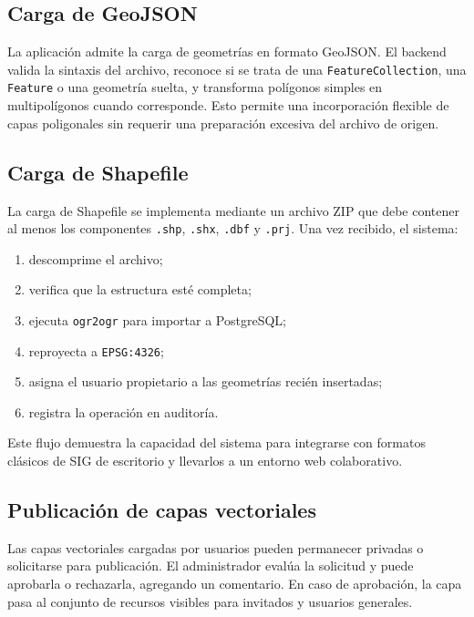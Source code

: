 \documentclass[12pt,a4paper]{report}
\begin{document}
\subsection{Carga de GeoJSON}

La aplicaci\'on admite la carga de geometr\'ias en formato GeoJSON. El backend valida la sintaxis del archivo, reconoce si se trata de una \texttt{FeatureCollection}, una \texttt{Feature} o una geometr\'ia suelta, y transforma pol\'igonos simples en multipol\'igonos cuando corresponde. Esto permite una incorporaci\'on flexible de capas poligonales sin requerir una preparaci\'on excesiva del archivo de origen.

\subsection{Carga de Shapefile}

La carga de Shapefile se implementa mediante un archivo ZIP que debe contener al menos los componentes \texttt{.shp}, \texttt{.shx}, \texttt{.dbf} y \texttt{.prj}. Una vez recibido, el sistema:

\begin{enumerate}
    \item descomprime el archivo;
    \item verifica que la estructura est\'e completa;
    \item ejecuta \texttt{ogr2ogr} para importar a PostgreSQL;
    \item reproyecta a \texttt{EPSG:4326};
    \item asigna el usuario propietario a las geometr\'ias reci\'en insertadas;
    \item registra la operaci\'on en auditor\'ia.
\end{enumerate}

Este flujo demuestra la capacidad del sistema para integrarse con formatos cl\'asicos de SIG de escritorio y llevarlos a un entorno web colaborativo.

\subsection{Publicaci\'on de capas vectoriales}

Las capas vectoriales cargadas por usuarios pueden permanecer privadas o solicitarse para publicaci\'on. El administrador eval\'ua la solicitud y puede aprobarla o rechazarla, agregando un comentario. En caso de aprobaci\'on, la capa pasa al conjunto de recursos visibles para invitados y usuarios generales.
\end{document}
